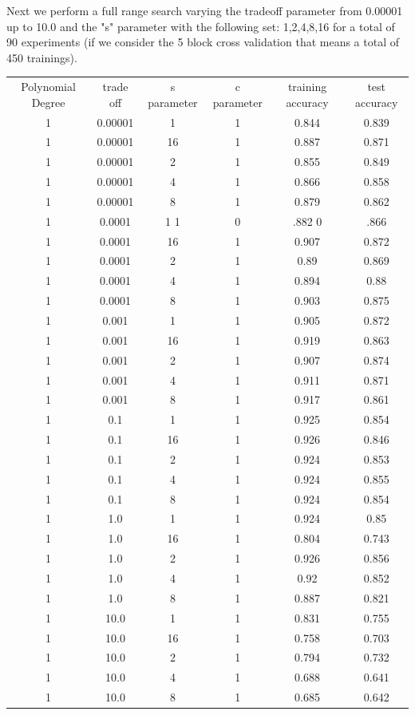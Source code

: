 \documentclass[a4paper,10pt,titlepage]{article}
\begin{document}
\par Next we perform a full range search varying the tradeoff parameter from 0.00001 up to 10.0 and the "s" parameter with the following set: 1,2,4,8,16 for a total of 90 experiments (if we consider the 5 block cross validation that means a total of 450 trainings).

\begin{tabular}{c c c c c c} 
\hline\hline 
Polynomial Degree & trade off  & s parameter & c parameter & training accuracy & test accuracy \\
1 & 0.00001 & 1 & 1 & 0.844 & 0.839 \\
1 & 0.00001 & 16 & 1 & 0.887 & 0.871 \\
1 & 0.00001 & 2  & 1  &0.855  &0.849 \\
1 & 0.00001 & 4  & 1  &0.866  &0.858 \\
1 & 0.00001 & 8  & 1  &0.879  &0.862 \\
1 & 0.0001 & 1 1 & 0 &.882 0 &.866 \\
1 & 0.0001 & 16 & 1 & 0.907 & 0.872 \\
1 & 0.0001 & 2 & 1 & 0.89 & 0.869 \\
1 & 0.0001 & 4 & 1 & 0.894 & 0.88 \\
1 & 0.0001 & 8 & 1 & 0.903 & 0.875 \\
1 & 0.001 & 1  & 1 & 0.905 & 0.872 \\
1 & 0.001 & 16 & 1 & 0.919 & 0.863 \\
1 & 0.001 & 2  & 1 & 0.907 & 0.874 \\
1 & 0.001 & 4 & 1 & 0.911 & 0.871 \\
1 & 0.001 & 8 & 1 & 0.917 & 0.861 \\
1 & 0.1 & 1 & 1 & 0.925 & 0.854 \\
1 & 0.1 & 16 & 1 & 0.926 & 0.846 \\
1 & 0.1 & 2 & 1 & 0.924 & 0.853 \\
1 & 0.1 & 4 & 1 & 0.924 & 0.855 \\
1 & 0.1 & 8 & 1 & 0.924 & 0.854 \\
1 & 1.0 & 1 & 1 & 0.924 & 0.85 \\
1 & 1.0 & 16 & 1 & 0.804 & 0.743 \\
1 & 1.0 & 2 & 1 & 0.926 & 0.856 \\
1 & 1.0 & 4 & 1 & 0.92  &0.852 \\
1 & 1.0 & 8 & 1 & 0.887 & 0.821 \\
1 & 10.0 & 1 & 1 & 0.831 & 0.755 \\
1 & 10.0 & 16 & 1 & 0.758 & 0.703 \\
1 & 10.0 & 2 & 1 & 0.794 & 0.732 \\
1 & 10.0 & 4 & 1 & 0.688 & 0.641 \\
1 & 10.0 & 8 & 1 & 0.685 & 0.642 \\
\hline 
\end{tabular} 
\label{tab:dist_result}
\end{document}
